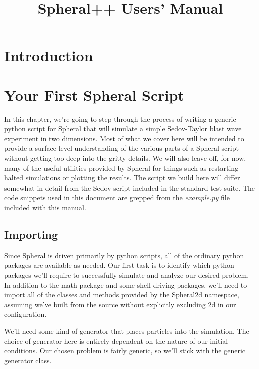 \documentclass[11pt]{memoir}
\title{Spheral++ Users' Manual}
\begin{document}
\maketitle

\chapter{Introduction}

\chapter{Your First Spheral Script}

\lstset{basicstyle=\small,style=myCustomPythonStyle}

In this chapter, we're going to step through the process of writing a generic python script for Spheral that will simulate a simple Sedov-Taylor blast wave experiment in two dimensions. 
Most of what we cover here will be intended to provide a surface level understanding of the various parts of a Spheral script without getting too deep into the gritty details. 
We will also leave off, for now, many of the useful utilities provided by Spheral for things such as restarting halted simulations or plotting the results. 
The script we build here will differ somewhat in detail from the Sedov script included in the standard test suite. 
The code snippets used in this document are grepped from the \textit{example.py} file included with this manual.

\section{Importing}

Since Spheral is driven primarily by python scripts, all of the ordinary python packages are available as needed. 
Our first task is to identify which python packages we'll require to successfully simulate and analyze our desired problem. 
In addition to the math package and some shell driving packages, we'll need to import all of the classes and methods provided by the Spheral2d namespace, assuming we've built from the source without explicitly excluding 2d in our configuration.



We'll need some kind of generator that places particles into the simulation. 
The choice of generator here is entirely dependent on the nature of our initial conditions. 
Our chosen problem is fairly generic, so we'll stick with the generic generator class.
\end{document}
